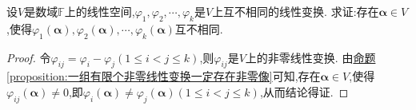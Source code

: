 \documentclass[../../main.tex]{subfiles}
\begin{document}
\begin{proposition}\label{proposition:一组有限个非零线性变换一定存在互不相同的像}
设\(V\)是数域\(\mathbb{F}\)上的线性空间,\(\varphi_1,\varphi_2,\cdots,\varphi_k\)是\(V\)上互不相同的线性变换. 求证:存在\(\boldsymbol{\alpha}\in V\),使得\(\varphi_1(\boldsymbol{\alpha}),\varphi_2(\boldsymbol{\alpha}),\cdots,\varphi_k(\boldsymbol{\alpha})\)互不相同.
\end{proposition}
\begin{proof}
令\(\varphi_{ij}=\varphi_i - \varphi_j(1\leqslant  i<j\leqslant  k)\),则\(\varphi_{ij}\)是\(V\)上的非零线性变换. 由\hyperref[proposition:一组有限个非零线性变换一定存在非零像]{命题\ref{proposition:一组有限个非零线性变换一定存在非零像}}可知,存在\(\boldsymbol{\alpha}\in V\),使得\(\varphi_{ij}(\boldsymbol{\alpha})\neq 0\),即\(\varphi_i(\boldsymbol{\alpha})\neq\varphi_j(\boldsymbol{\alpha})(1\leqslant  i<j\leqslant  k)\),从而结论得证. 
\end{proof}
\end{document}
